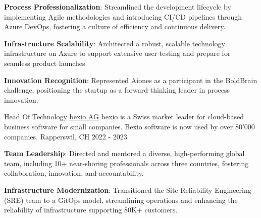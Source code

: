\begin{cventries}
{\begin{cvitems}
      \item {\textbf{Process Professionalization}: Streamlined the development lifecycle by implementing Agile methodologies and introducing CI/CD pipelines through Azure DevOps, fostering a culture of efficiency and continuous delivery.}
      \item {\textbf{Infrastructure Scalability}: Architected a robust, scalable technology infrastructure on Azure to support extensive user testing and prepare for seamless product launches}
      \item {\textbf{Innovation Recognition}: Represented Aiones as a participant in the BoldBrain challenge, positioning the startup as a forward-thinking leader in process innovation.}
    \end{cvitems}
  }
  \cventry
    {Head Of Technology} %
    {\href{https://www.bexio.com}{bexio AG}} %
    {bexio is a Swiss market leader for cloud-based business software for small companies. Bexio software is now used by over 80'000 companies.} %
    {Rapperswil, CH} %
    {2022 - 2023} %
    {
      \begin{cvitems} %
        \item {\textbf{Team Leadership}: Directed and mentored a diverse, high-performing global team, including 10+ near-shoring professionals across three countries, fostering collaboration, innovation, and accountability.}
        \item {\textbf{Infrastructure Modernization}: Transitioned the Site Reliability Engineering (SRE) team to a GitOps model, streamlining operations and enhancing the reliability of infrastructure supporting 80K+ customers.}

\end{cvitems}}
\end{cventries}
